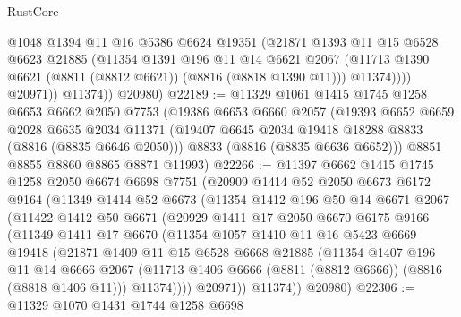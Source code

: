 \begin{lexlean}{RustCore}
\begin{coremodule}
                  @1048
                  @1394
                  @11
                  @16
                  @5386
                  @6624
                  @19351
                  (@21871
                    @1393
                    @11
                    @15
                    @6528
                    @6623
                    @21885
                    (@11354
                      @1391
                      @196
                      @11
                      @14
                      @6621
                      @2067
                      (@11713 @1390 @6621 (@8811 (@8812 @6621)) (@8816 (@8818 @1390 @11)))
                      @11374))))
              @20971))
          @11374))
      @20980)
@22189 := @11329
    @1061
    @1415
    @1745
    @1258
    @6653
    @6662
    @2050
    @7753
    (@19386
      @6653
      @6660
      @2057
      (@19393
        @6652
        @6659
        @2028
        @6635
        @2034
        @11371
        (@19407 @6645 @2034 @19418 @18288 @8833 (@8816 (@8835 @6646 @2050)))
        @8833
        (@8816 (@8835 @6636 @6652)))
      @8851
      @8855
      @8860
      @8865
      @8871
      @11993)
@22266 := @11397
    @6662
    @1415
    @1745
    @1258
    @2050
    @6674
    @6698
    @7751
    (@20909
      @1414
      @52
      @2050
      @6673
      @6172
      @9164
      (@11349
        @1414
        @52
        @6673
        (@11354
          @1412
          @196
          @50
          @14
          @6671
          @2067
          (@11422
            @1412
            @50
            @6671
            (@20929
              @1411
              @17
              @2050
              @6670
              @6175
              @9166
              (@11349
                @1411
                @17
                @6670
                (@11354
                  @1057
                  @1410
                  @11
                  @16
                  @5423
                  @6669
                  @19418
                  (@21871
                    @1409
                    @11
                    @15
                    @6528
                    @6668
                    @21885
                    (@11354
                      @1407
                      @196
                      @11
                      @14
                      @6666
                      @2067
                      (@11713 @1406 @6666 (@8811 (@8812 @6666)) (@8816 (@8818 @1406 @11)))
                      @11374))))
              @20971))
          @11374))
      @20980)
@22306 := @11329
    @1070
    @1431
    @1744
    @1258
    @6698

\end{coremodule}
\end{lexlean}
